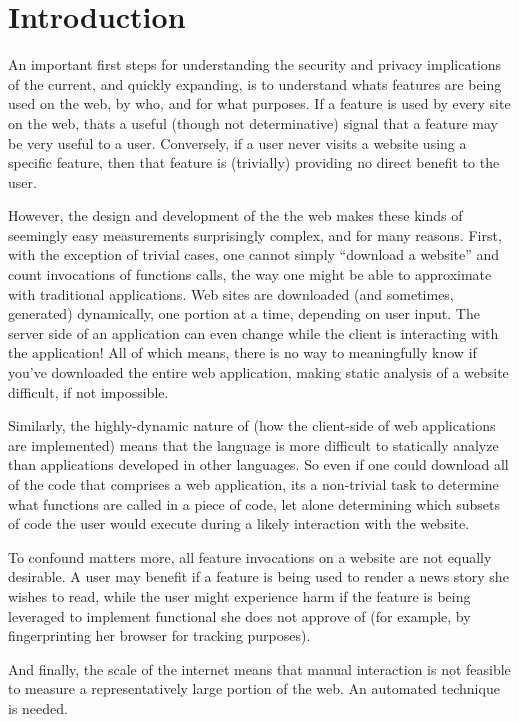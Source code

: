 \section{Introduction}
\label{measurement:overview}

An important first steps for understanding the security and privacy implications
of the current, and quickly expanding, \WAPI is to understand whats features
are being used on the web, by who, and for what purposes.  If a \WAPI feature
is used by every site on the web, thats a useful (though not determinative)
signal that a feature may be very useful to a user.  Conversely, if a user
never visits a website using a specific \WAPI feature, then that feature
is (trivially) providing no direct benefit to the user.

However, the design and development of the the web makes these kinds of
seemingly easy measurements surprisingly complex, and for many reasons.
First, with the exception of trivial cases, one cannot simply ``download
a website'' and count invocations of functions calls, the way one might be
able to approximate with traditional applications.   Web sites are downloaded
(and sometimes, generated) dynamically, one portion at a time, depending on user
input. The server side of an application can even change while the client is
interacting with the application!  All of which means, there is no way to
meaningfully know if you've downloaded the entire web application, making
static analysis of a website difficult, if not impossible.

Similarly, the highly-dynamic nature of \JS (how the client-side of web
applications are implemented) means that the language is more difficult to
statically analyze than applications developed in other languages.  So even
if one could download all of the \JS code that comprises a web application,
its a non-trivial task to determine what \WAPI functions are called in a piece of
code, let alone determining which subsets of code the user would execute during
a likely interaction with the website.

To confound matters more, all feature invocations on a website are not equally
desirable.  A user may benefit if a feature is being used to render a news
story she wishes to read, while the user might experience harm if the feature
is being leveraged to implement functional she does not approve of (for example,
by fingerprinting her browser for tracking purposes).

And finally, the scale of the internet means that manual interaction is not
feasible to measure a representatively large portion of the web.  An automated
technique is needed.


